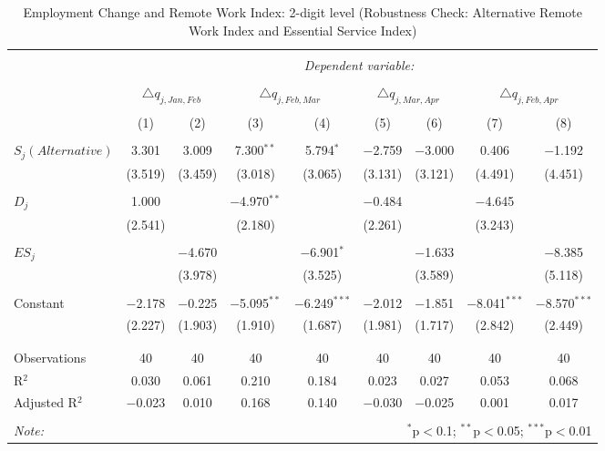 
\begin{table}[!htbp] \centering 
  \caption{Employment Change and Remote Work Index: 2-digit level (Robustness Check: Alternative Remote Work Index and Essential Service Index)} 
  \label{tab:regression_dynamics_2digit_alternative_robustness_essential_service} 
\footnotesize 
\begin{tabular}{@{\extracolsep{5pt}}lcccccccc} 
\\[-1.8ex]\hline 
\hline \\[-1.8ex] 
 & \multicolumn{8}{c}{\textit{Dependent variable:}} \\ 
\cline{2-9} 
\\[-1.8ex] & \multicolumn{2}{c}{$\triangle q_{j,Jan,Feb}$} & \multicolumn{2}{c}{$\triangle q_{j,Feb,Mar}$} & \multicolumn{2}{c}{$\triangle q_{j,Mar,Apr}$} & \multicolumn{2}{c}{$\triangle q_{j,Feb,Apr}$} \\ 
\\[-1.8ex] & (1) & (2) & (3) & (4) & (5) & (6) & (7) & (8)\\ 
\hline \\[-1.8ex] 
 $S_{j} (Alternative)$ & 3.301 & 3.009 & 7.300$^{**}$ & 5.794$^{*}$ & $-$2.759 & $-$3.000 & 0.406 & $-$1.192 \\ 
  & (3.519) & (3.459) & (3.018) & (3.065) & (3.131) & (3.121) & (4.491) & (4.451) \\ 
  & & & & & & & & \\ 
 $D_{j}$ & 1.000 &  & $-$4.970$^{**}$ &  & $-$0.484 &  & $-$4.645 &  \\ 
  & (2.541) &  & (2.180) &  & (2.261) &  & (3.243) &  \\ 
  & & & & & & & & \\ 
 $ES_{j}$ &  & $-$4.670 &  & $-$6.901$^{*}$ &  & $-$1.633 &  & $-$8.385 \\ 
  &  & (3.978) &  & (3.525) &  & (3.589) &  & (5.118) \\ 
  & & & & & & & & \\ 
 Constant & $-$2.178 & $-$0.225 & $-$5.095$^{**}$ & $-$6.249$^{***}$ & $-$2.012 & $-$1.851 & $-$8.041$^{***}$ & $-$8.570$^{***}$ \\ 
  & (2.227) & (1.903) & (1.910) & (1.687) & (1.981) & (1.717) & (2.842) & (2.449) \\ 
  & & & & & & & & \\ 
\hline \\[-1.8ex] 
Observations & 40 & 40 & 40 & 40 & 40 & 40 & 40 & 40 \\ 
R$^{2}$ & 0.030 & 0.061 & 0.210 & 0.184 & 0.023 & 0.027 & 0.053 & 0.068 \\ 
Adjusted R$^{2}$ & $-$0.023 & 0.010 & 0.168 & 0.140 & $-$0.030 & $-$0.025 & 0.001 & 0.017 \\ 
\hline 
\hline \\[-1.8ex] 
\textit{Note:}  & \multicolumn{8}{r}{$^{*}$p$<$0.1; $^{**}$p$<$0.05; $^{***}$p$<$0.01} \\ 
\end{tabular} 
\end{table} 
